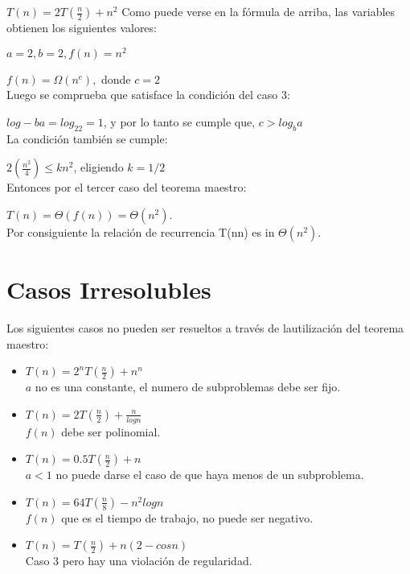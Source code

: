 \documentclass[12pt, letterpaper]{article} %
\begin{document}
$T(n)=2T(\frac{n}{2})+n^2$
Como puede verse en la fórmula de arriba, las variables obtienen los siguientes valores:
\par \hspace{2mm} $a=2, b=2, f(n)=n^2$
\par \hspace{2mm} $f(n)=\Omega(n^c),$ donde $c=2$\\
Luego se comprueba que satisface la condición del caso 3:
\par \hspace{2mm} $log-ba=log_22=1$, y por lo tanto se cumple que, $c>log_ba$\\
La condición también se cumple:
\par\hspace{2mm} $2(\frac{n^2}{4})\leq kn^2$, eligiendo $k=1/2$\\
Entonces por el tercer caso del teorema maestro:
\par\hspace{2mm} $T(n)=\Theta(f(n))=\Theta(n^2)$.\\
Por consiguiente la relación de recurrencia T(nn) es in $\Theta(n^2)$.

\section{Casos Irresolubles}\hline
Los siguientes casos no pueden ser resueltos a través de lautilización del teorema maestro: \cite{massacusets}

\begin{itemize}
    \item $T(n)=2^nT(\frac{n}{2})+n^n$ \\
    $a$ no es una constante, el numero de subproblemas debe ser fijo.
    \item $T(n)=2T(\frac{n}{2})+\frac{n}{logn}$\\
    $f(n)$ debe ser polinomial.
   \item $T(n)=0.5T(\frac{n}{2})+n$ \\
    $a<1$ no puede darse el caso de que haya menos de un subproblema.
    \item $T(n)=64T(\frac{n}{8})-n^2logn$ \\
    $f(n)$ que es el tiempo de trabajo, no puede ser negativo.
    \item $T(n)=T(\frac{n}{2})+n(2-cosn)$ \\
    Caso 3 pero hay una violación de regularidad.

\end{itemize}
\end{document}
